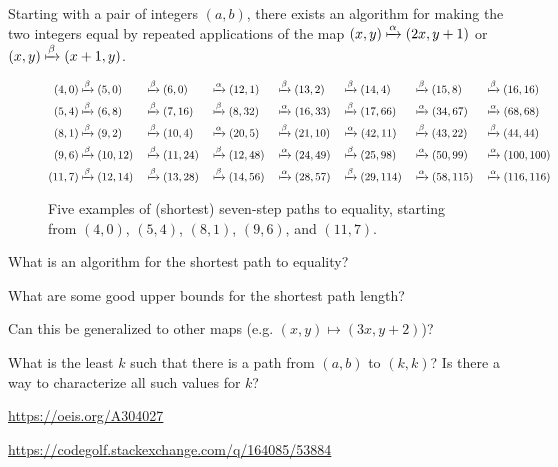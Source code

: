 \documentclass{article}
\begin{document}
Starting with a pair of integers $(a, b)$, there exists an algorithm for making
the two integers equal by repeated applications of the map
$(x, y) \xmapsto{\alpha} (2x, y+1)$ or $(x, y) \xmapsto{\beta} (x+1, y)$.
\begin{figure}[ht!]
  \centering
  \begin{alignat*}{7}
    (4,0)
      & \xmapsto{\beta} (5,0)
      && \xmapsto{\beta} (6,0)
      && \xmapsto{\alpha} (12,1)
      && \xmapsto{\beta} (13,2)
      && \xmapsto{\beta} (14,4)
      && \xmapsto{\beta} (15,8)
      && \xmapsto{\beta} (16,16)\\
    (5,4)
      & \xmapsto{\beta} (6,8)
      && \xmapsto{\beta} (7,16)
      && \xmapsto{\beta} (8,32)
      && \xmapsto{\alpha} (16,33)
      && \xmapsto{\beta} (17,66)
      && \xmapsto{\alpha} (34,67)
      && \xmapsto{\alpha} (68,68)\\
    (8,1)
      & \xmapsto{\beta} (9,2)
      && \xmapsto{\beta} (10,4)
      && \xmapsto{\alpha} (20,5)
      && \xmapsto{\beta} (21,10)
      && \xmapsto{\alpha} (42,11)
      && \xmapsto{\beta} (43,22)
      && \xmapsto{\beta} (44,44)\\
    (9,6)
      & \xmapsto{\beta} (10,12)
      && \xmapsto{\beta} (11,24)
      && \xmapsto{\beta} (12,48)
      && \xmapsto{\alpha} (24,49)
      && \xmapsto{\beta} (25,98)
      && \xmapsto{\alpha} (50,99)
      && \xmapsto{\alpha} (100,100)\\
    (11,7)
      & \xmapsto{\beta} (12,14)
      && \xmapsto{\beta} (13,28)
      && \xmapsto{\beta} (14,56)
      && \xmapsto{\alpha} (28,57)
      && \xmapsto{\beta} (29,114)
      && \xmapsto{\alpha} (58,115)
      && \xmapsto{\alpha} (116,116)
  \end{alignat*}
  \caption{
    Five examples of (shortest) seven-step paths to equality, starting from
    $(4,0)$, $(5,4)$, $(8,1)$, $(9,6)$, and $(11,7)$.
  }
\end{figure}
\begin{question}
  What is an algorithm for the shortest path to equality?
\end{question}

\begin{related}
  \item What are some good upper bounds for the shortest path length?
  \item Can this be generalized to other maps (e.g. $(x, y) \mapsto (3x, y+2)$)?
  \item What is the least $k$ such that there is a path from
    $(a, b)$ to $(k, k)$? Is there a way to characterize all such values for $k$?
\end{related}
\begin{references}
  \item \url{https://oeis.org/A304027}
  \item \url{https://codegolf.stackexchange.com/q/164085/53884}
\end{references}
\end{document}
